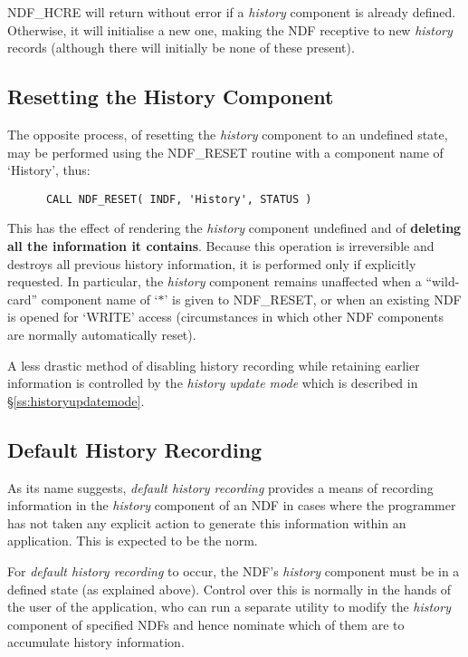 \documentclass[twoside,11pt]{article}
\newcommand{\htmlref}[2]{#1}
\newcommand{\xlabel}[1]{}
\newcommand{\st}[1]{{\em{#1}}}
\begin{document}
NDF\_HCRE will return without error if a \st{history\/} component is
already defined. Otherwise, it will initialise a new one, making the
NDF receptive to new \st{history\/} records (although there will
initially be none of these present).

\subsection{\xlabel{resetting_the_history_component}\label{ss:resettinghistory}Resetting the History Component}

The opposite process, of resetting the \st{history\/} component to an
undefined state, may be performed using the \htmlref{NDF\_RESET}{NDF_RESET} routine with a
component name of `History', thus:

\small
\begin{verbatim}
      CALL NDF_RESET( INDF, 'History', STATUS )
\end{verbatim}
\normalsize

This has the effect of rendering the \st{history\/} component undefined
and of {\bf deleting all the information it contains}. Because this
operation is irreversible and destroys all previous history
information, it is performed only if explicitly requested. In
particular, the \st{history\/} component remains unaffected when a
``wild-card'' component name of `$*$' is given to NDF\_RESET, or when
an existing NDF is opened for `WRITE' access (circumstances in which
other NDF components are normally automatically reset).

A less drastic method of disabling history recording while retaining
earlier information is controlled by the \st{history update mode\/}
which is described in \S\ref{ss:historyupdatemode}.

\subsection{\xlabel{default_history_recording}\label{ss:defaulthistory}Default History Recording}
As its name suggests, \st{default history recording\/} provides a means
of recording information in the \st{history\/} component of an NDF in
cases where the programmer has not taken any explicit action to
generate this information within an application. This is expected to
be the norm.

For \st{default history recording\/} to occur, the NDF's \st{history\/}
component must be in a defined state (as explained above). Control
over this is normally in the hands of the user of the application, who
can run a separate utility to modify the \st{history\/} component of
specified NDFs and hence nominate which of them are to accumulate
history information.
\end{document}
